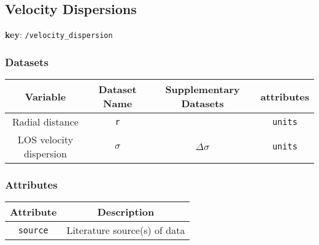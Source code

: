 \subsection{Velocity Dispersions}

\textbf{key}: \texttt{/velocity\_dispersion}

\subsubsection{Datasets}

\begin{center}
\begin{tabular}{ | c | c | c | c | }
    \hline
    Variable & Dataset Name & Supplementary Datasets &  attributes \\
    \hline\hline
    Radial distance & \texttt{r} & & \texttt{units} \\
    \hline
    LOS velocity dispersion & \texttt{\(\sigma\)} & \texttt{\(\Delta\sigma\)} &
    \texttt{units}\\
    \hline
\end{tabular}
\end{center}

\subsubsection{Attributes}


\begin{center}
\begin{tabular}{ | c | c | }
    \hline
    Attribute & Description \\
    \hline\hline
    \texttt{source} & Literature source(s) of data \\
    \hline
\end{tabular}
\end{center}
